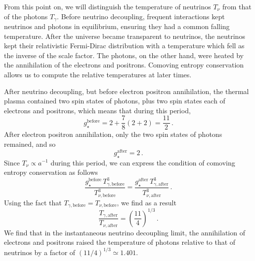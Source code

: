 From this point on, we will distinguish the temperature of neutrinos $T_\nu$ from that of the photons $T_\gamma$.  Before neutrino decoupling, frequent interactions kept neutrinos and photons in equilibrium, ensuring they had a common falling temperature.  After the universe became transparent to neutrinos, the neutrinos kept their relativistic Fermi-Dirac distribution with a temperature which fell as the inverse of the scale factor.  The photons, on the other hand, were heated by the annihilation of the electrons and positrons.  Comoving entropy conservation allows us to compute the relative temperatures at later times.

After neutrino decoupling, but before electron positron annihilation, the thermal plasma contained two spin states of photons, plus two spin states each of electrons and positrons, which means that during this period,
\begin{equation}
	g_{\star}^{\mathrm{before}} = 2 + \frac{7}{8}(2+2) = \frac{11}{2} \, .
\end{equation}
After electron positron annihilation, only the two spin states of photons remained, and so
\begin{equation}
	g_\star^{\mathrm{after}} = 2 \, .
\end{equation}
Since $T_\nu\propto a^{-1}$ during this period, we can express the condition of comoving entropy conservation as follows
\begin{equation}
	\frac{g_{\star}^{\mathrm{before}} \, T_{\gamma,\mathrm{before}}^3}{T_{\nu,\mathrm{before}}^3} = \frac{g_\star^{\mathrm{after}} \, T_{\gamma,\mathrm{after}}^3}{T_{\nu,\mathrm{after}}^3} \, .
\end{equation}
Using the fact that $T_{\gamma,\mathrm{before}} = T_{\nu,\mathrm{before}}$, we find as a result
\begin{equation}
	\frac{T_{\gamma,\mathrm{after}}}{T_{\nu,\mathrm{after}}} = \left(\frac{11}{4}\right)^{1/3} \, .
\end{equation}
We find that in the instantaneous neutrino decoupling limit, the annihilation of electrons and positrons raised the temperature of photons relative to that of neutrinos by a factor of $(11/4)^{1/3}\simeq1.401$.

